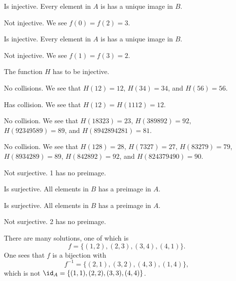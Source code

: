 \begin{questions}
    \item \begin{partquestions}{\alph*}
        \item Is injective. Every element in $A$ is has a unique image in $B$.
        \item Not injective. We see $f(0) = f(2) = 3$.
        \item Is injective. Every element in $A$ is has a unique image in $B$.
        \item Not injective. We see $f(1) = f(3) = 2$.
    \end{partquestions}

    \item \begin{partquestions}{\roman*}
        \item The function $H$ has to be injective.
        \item \begin{partquestions}{\alph*}
            \item No collisions. We see that $H(12) = 12$, $H(34) = 34$, and $H(56) = 56$.
            \item Has collision. We see that $H(12) = H(1112) = 12$.
            \item No collision. We see that $H(18323) = 23$, $H(389892) = 92$, $H(92349589) = 89$, and $H(8942894281) = 81$.
            \item No collision. We see that $H(128) = 28$, $H(7327) = 27$, $H(83279) = 79$, $H(8934289) = 89$, $H(842892) = 92$, and $H(824379490) = 90$.
        \end{partquestions}
    \end{partquestions}

    \item \begin{partquestions}{\alph*}
        \item Not surjective. 1 has no preimage.
        \item Is surjective. All elements in $B$ has a preimage in $A$.
        \item Is surjective. All elements in $B$ has a preimage in $A$.
        \item Not surjective. 2 has no preimage.
    \end{partquestions}

    \item There are many solutions, one of which is
    \[
        f = \{(1,2),(2,3),(3,4),(4,1)\}.
    \]
    One sees that $f$ is a bijection with
    \[
        f^{-1} = \{(2,1),(3,2),(4,3),(1,4)\},
    \]
    which is not $\id_A = \{(1,1),(2,2),(3,3),(4,4)\}$.


\end{questions}
